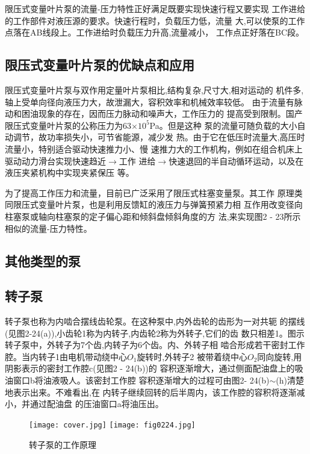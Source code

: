 限压式变量叶片泵的流量-压力特性正好满足既要实现快速行程又要实现
工作进给的工作部件对液压源的要求。快速行程时，负载压力低，流量
大,可以使泵的工作点落在AB线段上。工作进给时负载压力升高,流量减小，
工作点正好落在BC段。
\subsection*{限压式变量叶片泵的优缺点和应用}
限压式变量叶片泵与双作用定量叶片泵相比,结构复杂,尺寸大,相对运动的
机件多,轴上受单向径向液压力大，故泄漏大，容积效率和机械效率较低。
由于流量有脉动和困油现象的存在，因而压力脉动和噪声大，工作压力的
提高受到限制。国产限压式变量叶片泵的公称压力为63$\times $$10^5$Pa。但是这种
泵的流量可随负载的大小自动调节，故功率损失小，可节省能源，减少发
热。由于它在低压时流量大,高压时流量小，特别适合驱动快速推力小、慢
速推力大的工作机构，例如在组合机床上驱动动力滑台实现快速趋近$\rightarrow$工作
进给$\rightarrow$快速退回的半自动循环运动，以及在液压夹紧机构中实现夹紧保压
等。

为了提高工作压力和流量，目前已广泛采用了限压式柱塞变量泵。其工作
原理类同限压式变量叶片泵，也是利用反馈缸的液压力与弹簧预紧力相
互作用改变径向柱塞泵或轴向柱塞泵的定子偏心距和倾斜盘倾斜角度的方
法,来实现图2 - 23所示相似的流量-压力特性。
\begin{center}
    \section*{其他类型的泵}  
\end{center}
\subsection*{转子泵}
转子泵也称为内啮合摆线齿轮泵。在这种泵中,内外齿轮的齿形为一对共轭
的摆线(见图2-24(a)),小齿轮1称为内转子,内齿轮2称为外转子,它们的齿
数只相差1。图示转子泵中，外转子为7个齿,内转子为6个齿。内、外转子相
啮合形成若干密封工作腔。当内转子1由电机带动绕中心$O_1$旋转时,外转子2
被带着绕中心$O_2$同向旋转,用阴影表示的密封工作腔c(见图2 - 24(b))的
容积逐渐增大，通过侧面配油盘上的吸油窗口b将油液吸人。该密封工作腔
容积逐渐增大的过程可由图2- 24(b)$\sim $(h)清楚地表示出来。不难看出,在
内转子继续回转的后半周内，该工作腔的容积将逐渐减小，并通过配油盘
的压油窗口a将油压出。
\begin{figure} [htbp]
    \centering
    \ifOpenSource
    \texttt{[image: cover.jpg]}
    \else
    \texttt{[image: fig0224.jpg]}
    \fi
    \caption{转子泵的工作原理} 
    \label{fig:fig0224}
\end{figure}

